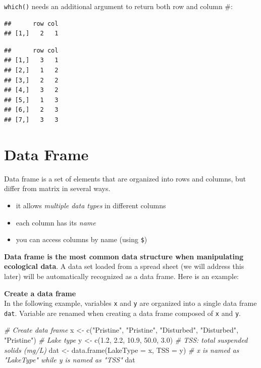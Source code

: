\documentclass[
]{book}
\newenvironment{Shaded}{\begin{snugshade}}{\end{snugshade}}
\newcommand{\AttributeTok}[1]{\textcolor[rgb]{0.77,0.63,0.00}{#1}}
\newcommand{\CommentTok}[1]{\textcolor[rgb]{0.56,0.35,0.01}{\textit{#1}}}
\newcommand{\FloatTok}[1]{\textcolor[rgb]{0.00,0.00,0.81}{#1}}
\newcommand{\FunctionTok}[1]{\textcolor[rgb]{0.00,0.00,0.00}{#1}}
\newcommand{\NormalTok}[1]{#1}
\newcommand{\OtherTok}[1]{\textcolor[rgb]{0.56,0.35,0.01}{#1}}
\newcommand{\StringTok}[1]{\textcolor[rgb]{0.31,0.60,0.02}{#1}}
\providecommand{\tightlist}{%
  \setlength{\itemsep}{0pt}\setlength{\parskip}{0pt}}
\begin{document}
\texttt{which()} needs an additional argument to return both row and column \#:

\begin{verbatim}
##      row col
## [1,]   2   1
\end{verbatim}

\begin{verbatim}
##      row col
## [1,]   3   1
## [2,]   1   2
## [3,]   2   2
## [4,]   3   2
## [5,]   1   3
## [6,]   2   3
## [7,]   3   3
\end{verbatim}

\hypertarget{data-frame}{%
\section{Data Frame}\label{data-frame}}

Data frame is a set of elements that are organized into rows and columns, but differ from matrix in several ways.

\begin{itemize}
\tightlist
\item
  it allows \emph{multiple data types} in different columns
\item
  each column has its \emph{name}
\item
  you can access columns by name (using \texttt{\$})
\end{itemize}

\textbf{Data frame is the most common data structure when manipulating ecological data}. A data set loaded from a spread sheet (we will address this later) will be automatically recognized as a data frame. Here is an example:

\textbf{Create a data frame}\\
In the following example, variables \texttt{x} and \texttt{y} are organized into a single data frame \texttt{dat}. Variable are renamed when creating a data frame composed of \texttt{x} and \texttt{y}.

\begin{Shaded}
\begin{Highlighting}[]
\CommentTok{\# Create data frame}
\NormalTok{x }\OtherTok{\textless{}{-}} \FunctionTok{c}\NormalTok{(}\StringTok{"Pristine"}\NormalTok{, }\StringTok{"Pristine"}\NormalTok{, }\StringTok{"Disturbed"}\NormalTok{, }\StringTok{"Disturbed"}\NormalTok{, }\StringTok{"Pristine"}\NormalTok{) }\CommentTok{\# Lake type}
\NormalTok{y }\OtherTok{\textless{}{-}} \FunctionTok{c}\NormalTok{(}\FloatTok{1.2}\NormalTok{, }\FloatTok{2.2}\NormalTok{, }\FloatTok{10.9}\NormalTok{, }\FloatTok{50.0}\NormalTok{, }\FloatTok{3.0}\NormalTok{) }\CommentTok{\# TSS: total suspended solids (mg/L)}
\NormalTok{dat }\OtherTok{\textless{}{-}} \FunctionTok{data.frame}\NormalTok{(}\AttributeTok{LakeType =}\NormalTok{ x, }\AttributeTok{TSS =}\NormalTok{ y) }\CommentTok{\# x is named as "LakeType" while y is named as "TSS"}
\NormalTok{dat}
\end{Highlighting}
\end{Shaded}
\end{document}
